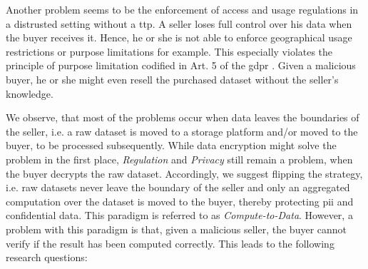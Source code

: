 
Another problem seems to be the enforcement of access and usage regulations in a distrusted setting without a \acrfull{ttp}. A seller loses full control over his data when the buyer receives it. Hence, he or she is not able to enforce geographical usage restrictions or purpose limitations for example. This especially violates the principle of purpose limitation codified in Art. 5 of the \acrshort{gdpr} \cite[Art. 5 (1 b)]{european_commission_regulation_2016}. Given a malicious buyer, he or she might even resell the purchased dataset without the seller's knowledge.

\noindent We observe, that most of the problems occur when data leaves the boundaries of the seller, i.e. a raw dataset is moved to a storage platform and/or moved to the buyer, to be processed subsequently. While data encryption might solve the problem in the first place, \emph{Regulation} and \emph{Privacy} still remain a problem, when the buyer decrypts the raw dataset. Accordingly, we suggest flipping the strategy, i.e. raw datasets never leave the boundary of the seller and only an aggregated computation over the dataset is moved to the buyer, thereby protecting \acrshort{pii} and confidential data. This paradigm is referred to as \emph{Compute-to-Data}. However, a problem with this paradigm is that, given a malicious seller, the buyer cannot verify if the result has been computed correctly. This leads to the following research questions:


